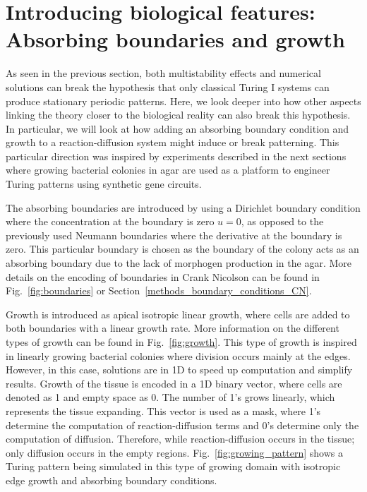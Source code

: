 \section{Introducing biological features: Absorbing boundaries and growth}
As seen in the previous section, both multistability effects and numerical solutions can break the hypothesis that only classical Turing I systems can produce stationary periodic patterns.
Here, we look deeper into how other aspects linking the theory closer to the biological reality can also break this hypothesis.
In particular, we will look at how adding an absorbing boundary condition and growth to a reaction-diffusion system might induce or break patterning.
This particular direction was inspired by experiments described in the next sections where growing bacterial colonies in agar are used as a platform to engineer Turing patterns using synthetic gene circuits.

The absorbing boundaries are introduced by using a Dirichlet boundary condition where the concentration at the boundary is zero $u=0$, as opposed to the previously used Neumann boundaries where the derivative at the boundary is zero.
This particular boundary is chosen as the boundary of the colony acts as an absorbing boundary due to the lack of morphogen production in the agar.
More details on the encoding of boundaries in Crank Nicolson can be found in Fig.~\ref{fig:boundaries} or Section~\ref{methods_boundary_conditions_CN}.

Growth is introduced as apical isotropic linear growth, where cells are added to both boundaries with a linear growth rate.
More information on the different types of growth can be found in Fig.~\ref{fig:growth}.
This type of growth is inspired in linearly growing bacterial colonies where division occurs mainly at the edges.
However, in this case, solutions are in 1D to speed up computation and simplify results.
Growth of the tissue is encoded in a 1D binary vector, where cells are denoted as 1 and empty space as 0.
The number of 1's grows linearly, which represents the tissue expanding.
This vector is used as a mask, where 1's determine the computation of reaction-diffusion terms and 0's determine only the computation of diffusion.
Therefore, while reaction-diffusion occurs in the tissue; only diffusion occurs in the empty regions.
Fig.~\ref{fig:growing_pattern} shows a Turing pattern being simulated in this type of growing domain with isotropic edge growth and absorbing boundary conditions.

